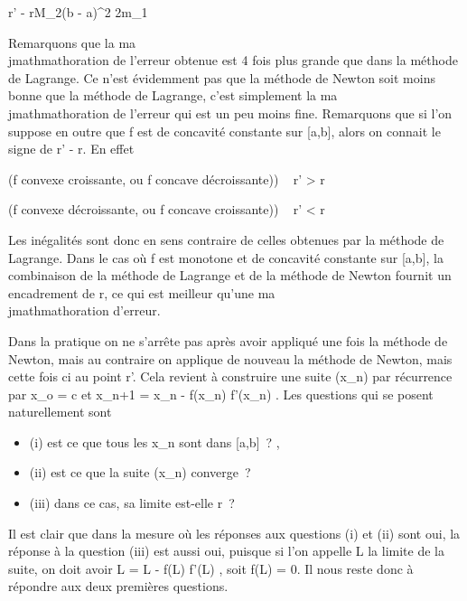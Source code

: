 \documentclass[]{article}
\begin{document}
r' - r\leq M_2(b - a)^2
\over 2m_1

Remarquons que la ma\\jmathmathoration de l'erreur obtenue est 4 fois plus grande
que dans la méthode de Lagrange. Ce n'est évidemment pas que la méthode
de Newton soit moins bonne que la méthode de Lagrange, c'est simplement
la ma\\jmathmathoration de l'erreur qui est un peu moins fine. Remarquons que si
l'on suppose en outre que f est de concavité constante sur {[}a,b{]},
alors on connait le signe de r' - r. En effet

(f convexe croissante, ou f concave décroissante)) \rigtharrow~ r' \textgreater{} r

(f convexe décroissante, ou f concave croissante)) \rigtharrow~ r' \textless{} r

Les inégalités sont donc en sens contraire de celles obtenues par la
méthode de Lagrange. Dans le cas où f est monotone et de concavité
constante sur {[}a,b{]}, la combinaison de la méthode de Lagrange et de
la méthode de Newton fournit un encadrement de r, ce qui est meilleur
qu'une ma\\jmathmathoration d'erreur.

Dans la pratique on ne s'arrête pas après avoir appliqué une fois la
méthode de Newton, mais au contraire on applique de nouveau la méthode
de Newton, mais cette fois ci au point r'. Cela revient à construire une
suite (x_n) par récurrence par x_o = c et
x_n+1 = x_n - f(x_n) \over
f'(x_n) . Les questions qui se posent naturellement sont

\begin{itemize}
\itemsep1pt\parskip0pt
\item
  (i) est ce que tous les x_n sont dans {[}a,b{]}~? ,
\item
  (ii) est ce que la suite (x_n) converge~?
\item
  (iii) dans ce cas, sa limite est-elle r~?
\end{itemize}

Il est clair que dans la mesure où les réponses aux questions (i) et
(ii) sont oui, la réponse à la question (iii) est aussi oui, puisque si
l'on appelle L la limite de la suite, on doit avoir L = L - f(L)
\over f'(L) , soit f(L) = 0. Il nous reste donc à
répondre aux deux premières questions.
\end{document}
